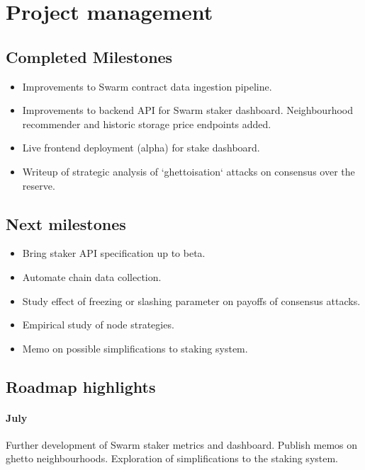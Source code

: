 \newpage
\section*{Project management}

\subsection*{Completed Milestones}

\begin{itemize}
  \item 
    Improvements to Swarm contract data ingestion pipeline.
  \item 
    Improvements to backend API for Swarm staker dashboard.
    Neighbourhood recommender and historic storage price endpoints added.
  \item
    Live frontend deployment (alpha) for stake dashboard.
  \item
    Writeup of strategic analysis of `ghettoisation` attacks on consensus over the reserve.

\end{itemize}

\subsection*{Next milestones}

\begin{itemize}
  \item Bring staker API specification up to beta.
  \item Automate chain data collection.
  \item Study effect of freezing or slashing parameter on payoffs of consensus attacks.
  \item Empirical study of node strategies. 
  \item Memo on possible simplifications to staking system.
\end{itemize}


\subsection*{Roadmap highlights}

\paragraph{July} 
%
Further development of Swarm staker metrics and dashboard. 
%
Publish memos on ghetto neighbourhoods.
%
Exploration of simplifications to the staking system.

